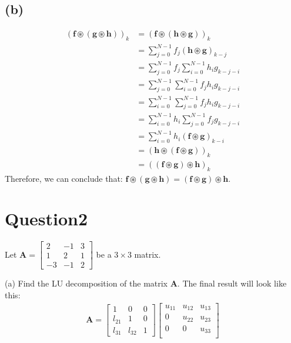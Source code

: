 \documentclass{article}
\begin{document}
\subsection*{(b)}
\begin{align*}
    (\bm{f} \circledast (\bm{g} \circledast \bm{h}))_k &= (\bm{f} \circledast (\bm{h} \circledast \bm{g}))_k \\ 
    &= \sum_{j = 0}^{N-1} f_j(\bm{h} \circledast \bm{g})_{k - j} \\
    &= \sum_{j = 0}^{N-1} f_j \sum_{i = 0}^{N-1} h_i g_{k - j - i} \\
    &= \sum_{j = 0}^{N-1}  \sum_{i = 0}^{N-1} f_j h_i g_{k - j - i} \\
    &= \sum_{i = 0}^{N-1} \sum_{j = 0}^{N-1} f_j h_i g_{k - j - i} \\
    &= \sum_{i = 0}^{N-1} h_i \sum_{j = 0}^{N-1} f_j  g_{k - j - i} \\
    &= \sum_{i = 0}^{N-1} h_i(\bm{f} \circledast \bm{g})_{k - i} \\
    &= (\bm{h} \circledast (\bm{f} \circledast \bm{g}))_k \\
    &= ((\bm{f} \circledast \bm{g}) \circledast \bm{h})_k
\end{align*}
Therefore, we can conclude that: \(\bm{f}\circledast (\bm{g} \circledast \bm{h}) = (\bm{f} \circledast \bm{g}) \circledast \bm{h}\). 

\section*{Question2}
Let \(\bm{A} = \begin{bmatrix}
   2 &-1 &3 \\
   1 & 2& 1 \\
   -3 &-1 &2 
\end{bmatrix}\) be a \(3 \times 3\) matrix.

\noindent 
(a) Find the LU decomposition of the matrix \(\bm{A}\). The final result will look like this:
\begin{align*}
    \bm{A} = \begin{bmatrix}
        1 & 0 & 0 \\
        l_{21} & 1 & 0 \\
        l_{31} & l_{32} & 1 
    \end{bmatrix} \begin{bmatrix}
        u_{11} &u_{12} &u_{13}   \\
        0 &u_{22} &u_{23}   \\
        0 &0 &u_{33}   \\
    \end{bmatrix}
\end{align*}
\end{document}
